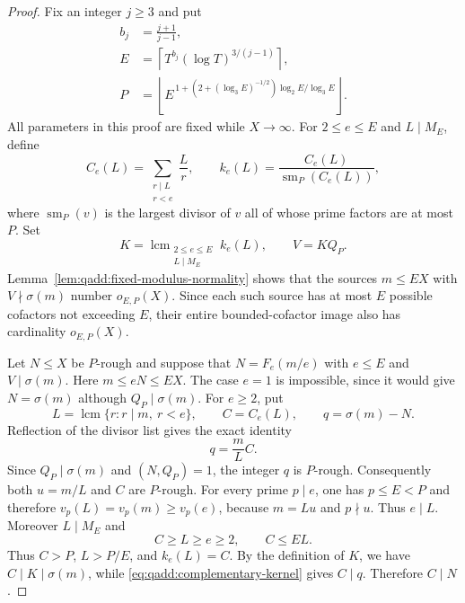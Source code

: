 \begin{proof}
Fix an integer $j\geq3$ and put
\begin{align*}
 b_j&=\frac{j+1}{j-1},\\
 E&=\left\lceil T^{b_j}
                (\log T)^{3/(j-1)}\right\rceil,\\
 P&=\left\lfloor
 E^{\,1+(2+(\log_3E)^{-1/2})\log_2E/\log_3E}
 \right\rfloor.
\end{align*}
All parameters in this proof are fixed while $X\to\infty$.
For $2\leq e\leq E$ and $L\mid M_E$, define
\[
 C_e(L)=\sum_{\substack{r\mid L\\r<e}}\frac Lr,
 \qquad
 k_e(L)=\frac{C_e(L)}{\operatorname{sm}_P(C_e(L))},
\]
where $\operatorname{sm}_P(v)$ is the largest divisor of $v$
all of whose prime factors are at most $P$. Set
\[
 K=\operatorname{lcm}_{\substack{2\leq e\leq E\\L\mid M_E}}
                     k_e(L),
 \qquad V=KQ_P.
\]
Lemma~\ref{lem:qadd:fixed-modulus-normality} shows that the
sources $m\leq EX$ with $V\nmid\sigma(m)$ number $o_{E,P}(X)$.
Since each such source has at most $E$ possible cofactors not
exceeding $E$, their entire bounded-cofactor image also has
cardinality $o_{E,P}(X)$.

Let $N\leq X$ be $P$-rough and suppose that
$N=F_e(m/e)$ with $e\leq E$ and $V\mid\sigma(m)$.
Here $m\leq eN\leq EX$. The case $e=1$ is impossible, since
it would give $N=\sigma(m)$ although $Q_P\mid\sigma(m)$.
For $e\geq2$, put
\[
 L=\operatorname{lcm}\{r:r\mid m,\ r<e\},
 \qquad C=C_e(L),
 \qquad q=\sigma(m)-N.
\]
Reflection of the divisor list gives the exact identity
\begin{equation}
\label{eq:qadd:complementary-kernel}
 q=\frac mL C.
\end{equation}
Since $Q_P\mid\sigma(m)$ and $(N,Q_P)=1$, the integer $q$ is
$P$-rough. Consequently both $u=m/L$ and $C$ are $P$-rough.
For every prime $p\mid e$, one has $p\leq E<P$ and therefore
$v_p(L)=v_p(m)\geq v_p(e)$, because $m=Lu$ and $p\nmid u$.
Thus $e\mid L$. Moreover $L\mid M_E$ and
\[
 C\geq L\geq e\geq2,
 \qquad C\leq EL.
\]
Thus $C>P$, $L>P/E$, and $k_e(L)=C$. By the definition of
$K$, we have $C\mid K\mid\sigma(m)$, while
\eqref{eq:qadd:complementary-kernel} gives $C\mid q$.
Therefore $C\mid N$.


\end{proof}
